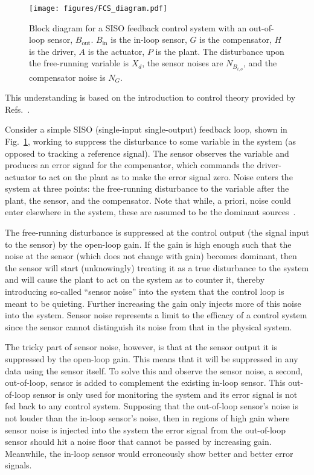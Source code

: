 \documentclass[aps,pra,superscriptaddress,reprint,nofootinbib]{revtex4-1}
\begin{document}
\begin{figure}
	\texttt{[image: figures/FCS\_diagram.pdf]}
	\caption{Block diagram for a SISO feedback control system with an out-of-loop sensor, $B_{\mathrm{out}}$. $B_{\mathrm{in}}$ is the in-loop sensor, $G$ is the compensator, $H$ is the driver, $A$ is the actuator, $P$ is the plant. The disturbance upon the free-running variable is $X_d$, the sensor noises are $N_{B_{i,o}}$, and the compensator noise is $N_G$.}
	\label{fig:block_FCS_diagram}
\end{figure}


This understanding is based on the introduction to control theory provided by Refs.~\cite{Ward:2010,Bechhoefer:2005,FCS:2000}.


Consider a simple SISO (single-input single-output) feedback loop, shown in Fig.~\ref{fig:block_FCS_diagram}, working to suppress the disturbance to some variable in the system (as opposed to tracking a reference signal). The sensor observes the variable and produces an error signal for the compensator, which commands the driver-actuator to act on the plant as to make the error signal zero. Noise enters the system at three points: the free-running disturbance to the variable after the plant, the sensor, and the compensator. Note that while, a priori, noise could enter elsewhere in the system, these are assumed to be the dominant sources~\cite{FCS:2000}. 


The free-running disturbance is suppressed at the control output (the signal input to the sensor) by the open-loop gain. If the gain is high enough such that the noise at the sensor (which does not change with gain) becomes dominant, then the sensor will start (unknowingly) treating it as a true disturbance to the system and will cause the plant to act on the system as to counter it, thereby introducing so-called ``sensor noise'' into the system that the control loop is meant to be quieting. Further increasing the gain only injects more of this noise into the system. Sensor noise represents a limit to the efficacy of a control system since the sensor cannot distinguish its noise from that in the physical system.


The tricky part of sensor noise, however, is that at the sensor output it is suppressed by the open-loop gain. This means that it will be suppressed in any data using the sensor itself. To solve this and observe the sensor noise, a second, out-of-loop, sensor is added to complement the existing in-loop sensor. This out-of-loop sensor is only used for monitoring the system and its error signal is not fed back to any control system. Supposing that the out-of-loop sensor’s noise is not louder than the in-loop sensor’s noise, then in regions of high gain where sensor noise is injected into the system the error signal from the out-of-loop sensor should hit a noise floor that cannot be passed by increasing gain. Meanwhile, the in-loop sensor would erroneously show better and better error signals.
\end{document}
